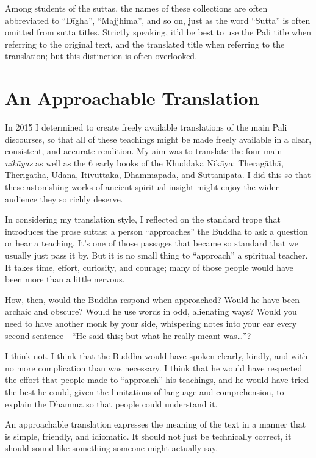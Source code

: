 \documentclass[12pt,openany]{book}%
\begin{document}
Among students of the suttas, the names of these collections are often abbreviated to “\textsanskrit{Dīgha}”, “Majjhima”, and so on, just as the word “Sutta” is often omitted from sutta titles. Strictly speaking, it’d be best to use the Pali title when referring to the original text, and the translated title when referring to the translation; but this distinction is often overlooked.

\section*{An Approachable Translation}

In 2015 I determined to create freely available translations of the main Pali discourses, so that all of these teachings might be made freely available in a clear, consistent, and accurate rendition. My aim was to translate the four main \textit{\textsanskrit{nikāyas}} as well as the 6 early books of the Khuddaka \textsanskrit{Nikāya}: \textsanskrit{Theragāthā}, \textsanskrit{Therīgāthā}, \textsanskrit{Udāna}, Itivuttaka, Dhammapada, and \textsanskrit{Suttanipāta}. I did this so that these astonishing works of ancient spiritual insight might enjoy the wider audience they so richly deserve.

In considering my translation style, I reflected on the standard trope that introduces the prose suttas: a person “approaches” the Buddha to ask a question or hear a teaching. It’s one of those passages that became so standard that we usually just pass it by. But it is no small thing to “approach” a spiritual teacher. It takes time, effort, curiosity, and courage; many of those people would have been more than a little nervous.

How, then, would the Buddha respond when approached? Would he have been archaic and obscure? Would he use words in odd, alienating ways? Would you need to have another monk by your side, whispering notes into your ear every second sentence—“He said this; but what he really meant was…”?

I think not. I think that the Buddha would have spoken clearly, kindly, and with no more complication than was necessary. I think that he would have respected the effort that people made to “approach” his teachings, and he would have tried the best he could, given the limitations of language and comprehension, to explain the Dhamma so that people could understand it.

An approachable translation expresses the meaning of the text in a manner that is simple, friendly, and idiomatic. It should not just be technically correct, it should sound like something someone might actually say.
\end{document}

